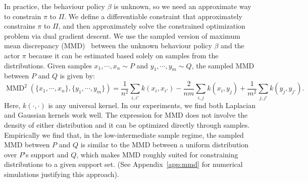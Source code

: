 In practice, the behaviour policy $\beta$ is unknown, so we need an approximate way to constrain $\pi$ to $\Pi$. We define a differentiable constraint that approximately constrains $\pi$ to $\Pi$, and then approximately solve the constrained optimization problem via dual gradient descent.  We use the sampled version of maximum mean discrepancy (MMD)~\cite{gretton2012kernel}
between the unknown behaviour policy $\beta$ and the actor $\pi$ because it can be estimated based solely on samples from the distributions. Given samples $x_1, \cdots, x_n \sim P$ and $y_1, \cdots, y_m \sim Q$, the sampled MMD between $P$ and $Q$ is given by:\\
$$\operatorname{MMD}^2(\{x_1, \cdots, x_n\}, \{y_1, \cdots, y_m\}) = \frac{1}{n^2} \sum_{i, i'} k(x_i, x_{i'}) - \frac{2}{nm} \sum_{i, j} k(x_i, y_j) + \frac{1}{m^2} \sum_{j, j'} k(y_j, y_{j'}).
$$
Here, $k(\cdot, \cdot)$ is any universal kernel. In our experiments, we find both Laplacian and Gaussian kernels work well.
The expression for MMD does not involve the density of either distribution and it can be optimized directly through samples. Empirically we find that, in the low-intermediate sample regime, the sampled MMD between $P$ and $Q$ is similar to the MMD between a uniform distribution over $P$'s support and $Q$, which makes MMD roughly suited for constraining distributions to a given support set. (See Appendix~\ref{app:mmd} for numerical simulations justifying this approach).


